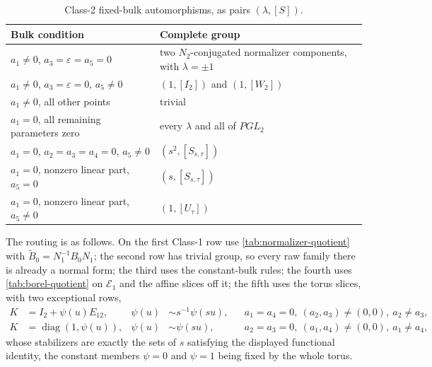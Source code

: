 \documentclass[11pt,reqno]{amsart}
\theoremstyle{plain}
\theoremstyle{definition}
\theoremstyle{remark}
\numberwithin{equation}{section}
\providecommand{\diag}{\operatorname{diag}}
\newcommand{\Id}{I_2}
\begin{document}
\begin{table}[t]
\centering\footnotesize
\caption{Class-2 fixed-bulk automorphisms, as pairs $(\lambda,[S])$.}
\label{tab:C2-aut}
\begin{tabularx}{\textwidth}{>{\RaggedRight\arraybackslash}X >{\RaggedRight\arraybackslash}X}
\toprule
Bulk condition & Complete group \\
\midrule
$a_1\ne0$, $a_3=\varepsilon=a_5=0$ & two $N_2$-conjugated normalizer components, with $\lambda=\pm1$ \\
$a_1\ne0$, $a_3=\varepsilon=0$, $a_5\ne0$ & $(1,[\Id])$ and $(1,[W_2])$ \\
$a_1\ne0$, all other points & trivial \\
$a_1=0$, all remaining parameters zero & every $\lambda$ and all of $PGL_2$ \\
$a_1=0$, $a_2=a_3=a_4=0$, $a_5\ne0$ & $(s^2,[S_{s,\tau}])$ \\
$a_1=0$, nonzero linear part, $a_5=0$ & $(s,[S_{s,\tau}])$ \\
$a_1=0$, nonzero linear part, $a_5\ne0$ & $(1,[U_\tau])$ \\
\bottomrule
\end{tabularx}
\end{table}

The routing is as follows. On the first Class-1 row use
\cref{tab:normalizer-quotient} with $\widetilde B_0=N_1^{-1}B_0N_1$; the second
row has trivial group, so every raw family there is already a normal form; the
third uses the constant-bulk rules; the fourth uses
\cref{tab:borel-quotient} on $\mathcal E_1$ and the affine slices off it; the
fifth uses the torus slices, with two exceptional rows,
\begin{align}
K&=\Id+\psi(u)E_{12},&
\psi(u)&\sim s^{-1}\psi(su),
&&a_1=a_4=0,\ (a_2,a_3)\ne(0,0),\ a_2\ne a_3,\label{eq:C1-upper-orbit}\\
K&=\diag(1,\psi(u)),&
\psi(u)&\sim \psi(su),
&&a_2=a_3=0,\ (a_1,a_4)\ne(0,0),\ a_1\ne a_4,\label{eq:C1-diag-orbit}
\end{align}
whose stabilizers are exactly the sets of $s$ satisfying the displayed functional
identity, the constant members $\psi=0$ and $\psi=1$ being fixed by the whole
torus.
\end{document}
